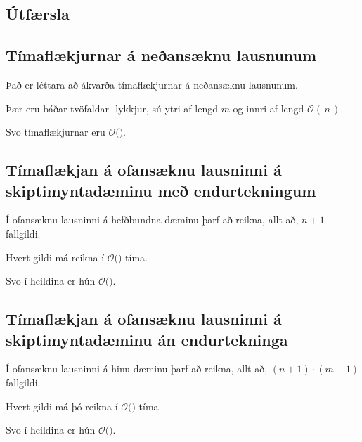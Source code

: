 \subsection{Útfærsla}
{
}

\subsection{Tímaflækjurnar á neðansæknu lausnunum}
{
    {
        \item<1-> Það er léttara að ákvarða tímaflækjurnar á neðansæknu lausnunum.
        \item<2-> Þær eru báðar tvöfaldar -lykkjur, sú ytri af lengd $m$ og innri af lengd $\mathcal{O}(\,n\,)$.
        \item<3-> Svo tímaflækjurnar eru $\mathcal{O}($$)$.
    }
}

\subsection{Tímaflækjan á ofansæknu lausninni á skiptimyntadæminu með endurtekningum}
{
    {
        \item<1-> Í ofansæknu lausninni á hefðbundna dæminu þarf að reikna, allt að, $n + 1$ fallgildi.
        \item<2-> Hvert gildi má reikna í $\mathcal{O}($$)$ tíma.
        \item<4-> Svo í heildina er hún $\mathcal{O}($$)$.
        \item<1->[] 
    }
}

\subsection{Tímaflækjan á ofansæknu lausninni á skiptimyntadæminu án endurtekninga}
{
    {
        \item<1-> Í ofansæknu lausninni á hinu dæminu þarf að reikna, allt að, $(n + 1) \cdot (m + 1)$ fallgildi.
        \item<2-> Hvert gildi má þó reikna í $\mathcal{O}($$)$ tíma.
        \item<4-> Svo í heildina er hún $\mathcal{O}($$)$.
        \item<1->[] 
    }
}

